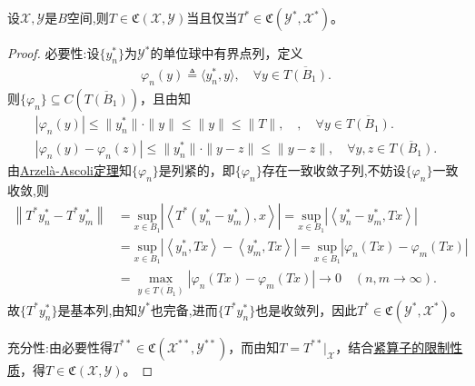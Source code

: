 \documentclass[../../main.tex]{subfiles}%
\begin{document}
\begin{theorem}
设$\mathscr{X},\mathscr{Y}$是$B$空间,则$T\in\mathfrak{C}(\mathscr{X},\mathscr{Y})$当且仅当$T^*\in\mathfrak{C}(\mathscr{Y}^*,\mathscr{X}^*)$。
\end{theorem}
\begin{proof}

{\heiti 必要性:}设$\{y_n^*\}$为$\mathscr{Y}^*$的单位球中有界点列，定义
\begin{align*}
\varphi_n(y)\triangleq\langle y_n^*,y\rangle,\quad \forall y\in\overline{T(B_1)}.
\end{align*}
则$\{\varphi_n\}\subseteq C(\overline{T(B_1)})$，且由知
\begin{gather*}
|\varphi _n(y)|\leqslant \parallel y_{n}^{*}\parallel \cdot \parallel y\parallel \leqslant \parallel y\parallel \leqslant \parallel T\parallel ,\quad ,\quad \forall y\in \overline{T(B_1)}.
\\
|\varphi _n(y)-\varphi _n(z)|\leqslant \parallel y_{n}^{*}\parallel \cdot \parallel y-z\parallel \leqslant \parallel y-z\parallel ,\quad \forall y,z\in \overline{T(B_1)}.
\end{gather*}
由\hyperref[theorem:泛函分析--Arzelà-Ascoli定理]{Arzelà-Ascoli定理}知$\{\varphi_n\}$是列紧的，即$\{\varphi_n\}$存在一致收敛子列,不妨设$\{\varphi_n\}$一致收敛,则
\begin{align*}
\left\| T^*y_{n}^{*}-T^*y_{m}^{*} \right\| &=\underset{x\in B_1}{\mathrm{sup}}\left| \left< T^*\left( y_{n}^{*}-y_{m}^{*} \right) ,x \right> \right|=\underset{x\in B_1}{\mathrm{sup}}\left| \left< y_{n}^{*}-y_{m}^{*},Tx \right> \right|
\\
&=\underset{x\in B_1}{\mathrm{sup}}\left| \left< y_{n}^{*},Tx \right> -\left< y_{m}^{*},Tx \right> \right|=\underset{x\in B_1}{\mathrm{sup}}\left| \varphi _n\left( Tx \right) -\varphi _m\left( Tx \right) \right|
\\
&=\underset{y\in \overline{T\left( B_1 \right) }}{\max}\left| \varphi _n\left( Tx \right) -\varphi _m\left( Tx \right) \right|\rightarrow 0\quad \left( n,m\rightarrow \infty \right) .
\end{align*}
故$\{T^*y_n^*\}$是基本列,由知$\mathscr{Y}^*$也完备,进而$\{T^*y_n^*\}$也是收敛列，因此$T^*\in\mathfrak{C}(\mathscr{Y}^*,\mathscr{X}^*)$。

{\heiti 充分性:}由必要性得$T^{**}\in\mathfrak{C}(\mathscr{X}^{**},\mathscr{Y}^{**})$，而由知$T=T^{**}|_{\mathscr{X}}$，结合\hyperref[proposition:泛函分析--命题3.1.2-4]{紧算子的限制性质}，得$T\in\mathfrak{C}(\mathscr{X},\mathscr{Y})$。
\end{proof}
\end{document}
